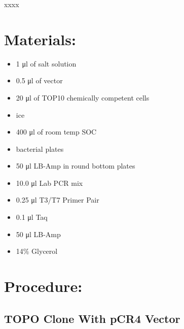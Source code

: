 \documentclass[
  letterpaper,
  DIV=11,
  numbers=noendperiod]{scrreprt}
\providecommand{\tightlist}{%
  \setlength{\itemsep}{0pt}\setlength{\parskip}{0pt}}\usepackage{longtable,booktabs,array}
\begin{document}
\begin{tcolorbox}[enhanced jigsaw, rightrule=.15mm, title=\textcolor{quarto-callout-warning-color}{\faExclamationTriangle}\hspace{0.5em}{NOTES}, titlerule=0mm, opacitybacktitle=0.6, toprule=.15mm, bottomrule=.15mm, opacityback=0, left=2mm, colframe=quarto-callout-warning-color-frame, breakable, coltitle=black, colback=white, colbacktitle=quarto-callout-warning-color!10!white, bottomtitle=1mm, leftrule=.75mm, toptitle=1mm, arc=.35mm]

xxxx

\end{tcolorbox}

\hypertarget{materials-25}{%
\section{Materials:}\label{materials-25}}

\begin{itemize}
\tightlist
\item
  1 μl of salt solution
\item
  0.5 μl of vector
\item
  20 μl of TOP10 chemically competent cells
\item
  ice
\item
  400 μl of room temp SOC
\item
  bacterial plates
\item
  50 μl LB-Amp in round bottom plates
\item
  10.0 μl Lab PCR mix
\item
  0.25 μl T3/T7 Primer Pair
\item
  0.1 μl Taq
\item
  50 μl LB-Amp
\item
  14\% Glycerol
\end{itemize}

\hypertarget{procedure-24}{%
\section{Procedure:}\label{procedure-24}}

\hypertarget{topo-clone-with-pcr4-vector}{%
\subsection{TOPO Clone With pCR4
Vector}\label{topo-clone-with-pcr4-vector}}
\end{document}
